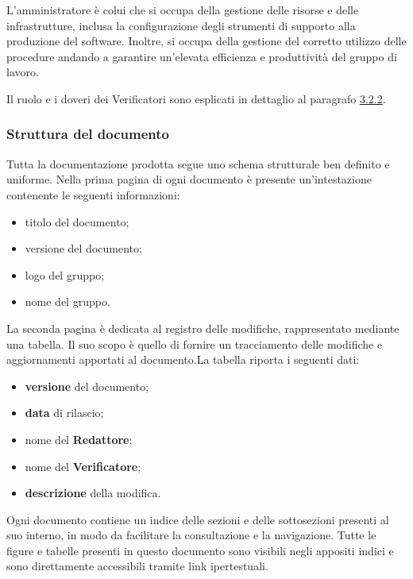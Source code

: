 L’amministratore è colui che si occupa della gestione delle risorse e delle infrastrutture, inclusa la configurazione degli strumenti di supporto alla produzione  del software. Inoltre, si occupa della gestione del corretto utilizzo delle procedure andando a garantire un’elevata efficienza e produttività del gruppo di lavoro.

Il ruolo e i doveri dei Verificatori sono esplicati in dettaglio al paragrafo \hyperref[verifica_dei_documenti]{3.2.2}.

\subsubsection{Struttura del documento}
Tutta la documentazione prodotta segue uno schema strutturale ben definito e uniforme.
Nella prima pagina di ogni documento è presente un'intestazione contenente le seguenti informazioni:
\begin{itemize}
	\item titolo del documento;
	\item versione del documento;
	\item logo del gruppo;
	\item nome del gruppo.
\end{itemize}

La seconda pagina è dedicata al registro delle modifiche, rappresentato mediante una tabella. Il suo scopo è quello di fornire un tracciamento delle modifiche e aggiornamenti apportati al documento.La tabella riporta i seguenti dati:
\begin{itemize}
	\item \textbf{versione} del documento;
	\item \textbf{data} di rilascio;
	\item nome del \textbf{Redattore};
	\item nome del \textbf{Verificatore};
	\item \textbf{descrizione} della modifica.
\end{itemize}

Ogni documento contiene un indice delle sezioni e delle sottosezioni presenti al suo interno, in modo da facilitare la consultazione e la navigazione. Tutte le figure e tabelle presenti in questo documento sono visibili negli appositi indici e sono direttamente accessibili tramite link ipertestuali.

